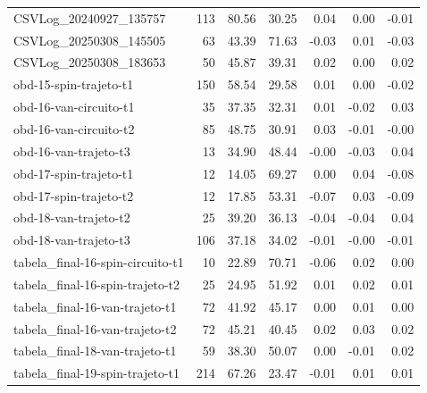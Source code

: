 \begin{tabular}{lrrrrrr}
CSVLog_20240927_135757 & 113 & 80.56 & 30.25 & 0.04 & 0.00 & -0.01 \\
CSVLog_20250308_145505 & 63 & 43.39 & 71.63 & -0.03 & 0.01 & -0.03 \\
CSVLog_20250308_183653 & 50 & 45.87 & 39.31 & 0.02 & 0.00 & 0.02 \\
obd-15-spin-trajeto-t1 & 150 & 58.54 & 29.58 & 0.01 & 0.00 & -0.02 \\
obd-16-van-circuito-t1 & 35 & 37.35 & 32.31 & 0.01 & -0.02 & 0.03 \\
obd-16-van-circuito-t2 & 85 & 48.75 & 30.91 & 0.03 & -0.01 & -0.00 \\
obd-16-van-trajeto-t3 & 13 & 34.90 & 48.44 & -0.00 & -0.03 & 0.04 \\
obd-17-spin-trajeto-t1 & 12 & 14.05 & 69.27 & 0.00 & 0.04 & -0.08 \\
obd-17-spin-trajeto-t2 & 12 & 17.85 & 53.31 & -0.07 & 0.03 & -0.09 \\
obd-18-van-trajeto-t2 & 25 & 39.20 & 36.13 & -0.04 & -0.04 & 0.04 \\
obd-18-van-trajeto-t3 & 106 & 37.18 & 34.02 & -0.01 & -0.00 & -0.01 \\
tabela_final-16-spin-circuito-t1 & 10 & 22.89 & 70.71 & -0.06 & 0.02 & 0.00 \\
tabela_final-16-spin-trajeto-t2 & 25 & 24.95 & 51.92 & 0.01 & 0.02 & 0.01 \\
tabela_final-16-van-trajeto-t1 & 72 & 41.92 & 45.17 & 0.00 & 0.01 & 0.00 \\
tabela_final-16-van-trajeto-t2 & 72 & 45.21 & 40.45 & 0.02 & 0.03 & 0.02 \\
tabela_final-18-van-trajeto-t1 & 59 & 38.30 & 50.07 & 0.00 & -0.01 & 0.02 \\
tabela_final-19-spin-trajeto-t1 & 214 & 67.26 & 23.47 & -0.01 & 0.01 & 0.01 \\
\bottomrule
\end{tabular}
